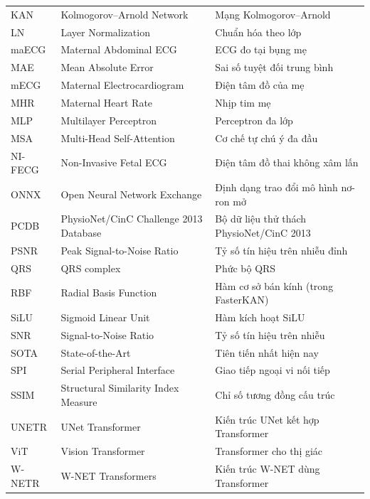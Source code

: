 \begin{center}
\begin{longtable}{p{2.3cm} p{5.5cm} p{6.2cm}}
KAN        & Kolmogorov--Arnold Network              & Mạng Kolmogorov--Arnold \\
LN         & Layer Normalization                     & Chuẩn hóa theo lớp \\
maECG      & Maternal Abdominal ECG                  & ECG đo tại bụng mẹ \\
MAE        & Mean Absolute Error                     & Sai số tuyệt đối trung bình \\
mECG       & Maternal Electrocardiogram              & Điện tâm đồ của mẹ \\
MHR        & Maternal Heart Rate                     & Nhịp tim mẹ \\
MLP        & Multilayer Perceptron                   & Perceptron đa lớp \\
MSA        & Multi-Head Self-Attention               & Cơ chế tự chú ý đa đầu \\
NI-FECG    & Non-Invasive Fetal ECG                  & Điện tâm đồ thai không xâm lấn \\
ONNX       & Open Neural Network Exchange            & Định dạng trao đổi mô hình nơ-ron mở \\
PCDB       & PhysioNet/CinC Challenge 2013 Database  & Bộ dữ liệu thử thách PhysioNet/CinC 2013 \\
PSNR       & Peak Signal-to-Noise Ratio              & Tỷ số tín hiệu trên nhiễu đỉnh \\
QRS        & QRS complex                             & Phức bộ QRS \\
RBF        & Radial Basis Function                   & Hàm cơ sở bán kính (trong FasterKAN) \\
SiLU       & Sigmoid Linear Unit                     & Hàm kích hoạt SiLU \\
SNR        & Signal-to-Noise Ratio                   & Tỷ số tín hiệu trên nhiễu \\
SOTA       & State-of-the-Art                        & Tiên tiến nhất hiện nay \\
SPI        & Serial Peripheral Interface             & Giao tiếp ngoại vi nối tiếp \\
SSIM       & Structural Similarity Index Measure     & Chỉ số tương đồng cấu trúc \\
UNETR      & UNet Transformer                        & Kiến trúc UNet kết hợp Transformer \\
ViT        & Vision Transformer                      & Transformer cho thị giác \\
W-NETR     & W-NET Transformers                      & Kiến trúc W-NET dùng Transformer \\
\end{longtable}
\end{center}
\renewcommand{\arraystretch}{1.0}
